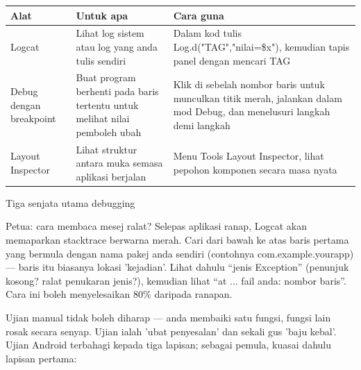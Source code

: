 


\begin{center}
\begin{tabularx}{\linewidth}{|X|X|X|}
\hline
\textbf{Alat} & \textbf{Untuk apa} & \textbf{Cara guna} \tabularnewline
\hline
Logcat & Lihat log sistem atau log yang anda tulis sendiri & Dalam kod tulis Log.d("TAG","nilai=\$x"), kemudian tapis panel dengan mencari TAG \tabularnewline
Debug dengan breakpoint & Buat program berhenti pada baris tertentu untuk melihat nilai pemboleh ubah & Klik di sebelah nombor baris untuk munculkan titik merah, jalankan dalam mod Debug, dan menelusuri langkah demi langkah \tabularnewline
Layout Inspector & Lihat struktur antara muka semasa aplikasi berjalan & Menu Tools Layout Inspector, lihat pepohon komponen secara masa nyata \tabularnewline
\hline
\end{tabularx}
\end{center}

\begin{center}\small\color{gray}Tiga senjata utama debugging\end{center}

\begin{tcbinfo}{Petua: cara membaca mesej ralat?}
Selepas aplikasi ranap, Logcat akan memaparkan stacktrace berwarna merah. Cari dari bawah ke atas baris pertama yang bermula dengan nama pakej anda sendiri (contohnya com.example.yourapp) — baris itu biasanya lokasi 'kejadian'. Lihat dahulu “jenis Exception” (penunjuk kosong? ralat penukaran jenis?), kemudian lihat “at ... fail anda: nombor baris”. Cara ini boleh menyelesaikan 80\% daripada ranapan.

\end{tcbinfo}


Ujian manual tidak boleh diharap — anda membaiki satu fungsi, fungsi lain rosak secara senyap. Ujian ialah 'ubat penyesalan' dan sekali gus 'baju kebal'. Ujian Android terbahagi kepada tiga lapisan; sebagai pemula, kuasai dahulu lapisan pertama:

